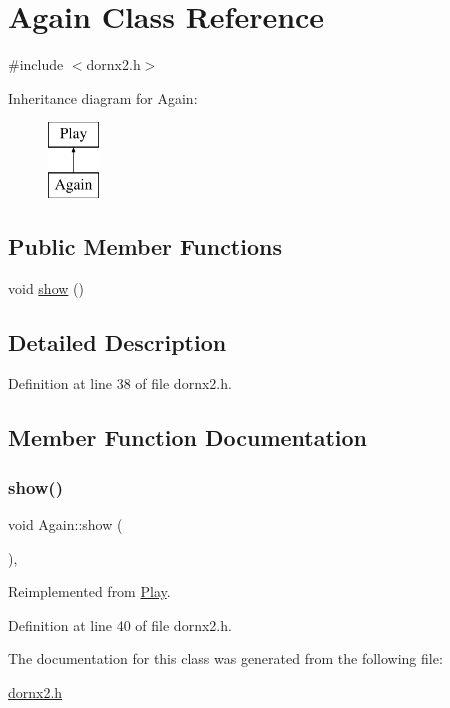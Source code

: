 \hypertarget{class_again}{}\section{Again Class Reference}
\label{class_again}


{\ttfamily \#include $<$dornx2.\+h$>$}

Inheritance diagram for Again\+:\begin{figure}[H]
\begin{center}
\leavevmode
\includegraphics[height=2.000000cm]{class_again}
\end{center}
\end{figure}
\subsection*{Public Member Functions}
\begin{DoxyCompactItemize}
\item 
void \hyperlink{class_again_af3e99a5b59be21b644823ce7a9837a8f}{show} ()
\end{DoxyCompactItemize}


\subsection{Detailed Description}


Definition at line 38 of file dornx2.\+h.



\subsection{Member Function Documentation}
\mbox{\label{class_again_af3e99a5b59be21b644823ce7a9837a8f}} 
\subsubsection{\texorpdfstring{show()}{show()}}
{\footnotesize\ttfamily void Again\+::show (\begin{DoxyParamCaption}{ }\end{DoxyParamCaption})\hspace{0.3cm}{\ttfamily [inline]}, {\ttfamily [virtual]}}



Reimplemented from \hyperlink{class_play_a87bb5456a9fcecfb9075b73db83d1e4c}{Play}.



Definition at line 40 of file dornx2.\+h.



The documentation for this class was generated from the following file\+:\begin{DoxyCompactItemize}
\item 
\hyperlink{dornx2_8h}{dornx2.\+h}\end{DoxyCompactItemize}
